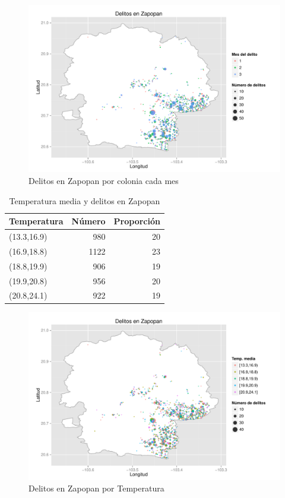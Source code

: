 \begin{figure}[H]
\centering
\caption{Delitos en Zapopan por colonia cada mes}
\includegraphics[width=120mm]{../../graphs/num_delitos_mes.pdf}
\end{figure}


\begin{table}[H]
\centering
\caption{Temperatura media y delitos en Zapopan}
\begin{tabular}{lrr}
  \hline
Temperatura & Número & Proporción \\ 
  \hline
(13.3,16.9) & 980 & 20 \\ 
  (16.9,18.8) & 1122 & 23 \\ 
  (18.8,19.9) & 906 & 19 \\ 
  (19.9,20.8) & 956 & 20 \\ 
  (20.8,24.1) & 922 & 19 \\ 
   \hline
\end{tabular}
\end{table}


\begin{figure}[H]
\centering
\caption{Delitos en Zapopan por Temperatura}
\includegraphics[width=120mm]{../../graphs/temperatura.pdf}
\end{figure}


